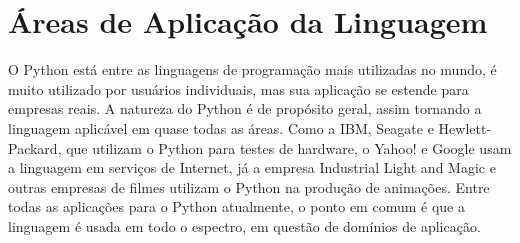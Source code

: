 
   \section{Áreas de Aplicação da Linguagem}
   O Python está entre as linguagens de programação mais utilizadas no mundo, é muito utilizado por usuários individuais, mas sua aplicação se estende para empresas reais. A natureza do Python é de propósito geral, assim tornando a linguagem aplicável em quase todas as áreas. Como a IBM, Seagate e Hewlett-Packard, que utilizam o Python para testes de hardware, o Yahoo! e Google usam a linguagem em serviços de Internet, já a empresa Industrial Light and Magic e outras empresas de filmes utilizam o Python na produção de animações. Entre todas as aplicações para o Python atualmente, o ponto em comum é que a linguagem é usada em todo o espectro, em questão de domínios de aplicação. \cite{Lutz2007}

